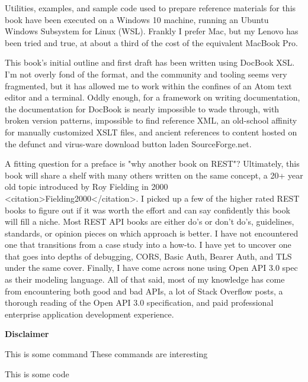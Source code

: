 Utilities, examples, and sample code used to prepare reference materials for this book have been executed on a Windows 10 machine, running an Ubuntu Windows Subsystem for Linux (WSL).  Frankly I prefer Mac, but my Lenovo has been tried and true, at about a third of the cost of the equivalent MacBook Pro.

This book's initial outline and first draft has been written using DocBook XSL.  I'm not overly fond of the format, and the community and tooling seems very fragmented, but it has allowed me to work within the confines of an Atom text editor and a terminal.  Oddly enough, for a framework on writing documentation, the documentation for DocBook is nearly impossible to wade through, with broken version patterns, impossible to find reference XML, an old-school affinity for manually customized XSLT files, and ancient references to content hosted on the defunct and virus-ware download button laden SourceForge.net.

A fitting question for a preface is "why another book on REST"?  Ultimately, this book will share a shelf with many others written on the same concept, a 20+ year old topic introduced by Roy Fielding in 2000 <citation>Fielding2000</citation>.  I picked up a few of the higher rated REST books to figure out if it was worth the effort and can say confidently this book will fill a niche. Most REST API books are either do's or don't do's, guidelines, standards, or opinion pieces on which approach is better.  I have not encountered one that transitions from a case study into a how-to.  I have yet to uncover one that goes into depths of debugging, CORS, Basic Auth, Bearer Auth, and TLS under the same cover.  Finally, I have come across none using Open API 3.0 spec as their modeling language.  All of that said, most of my knowledge has come from encountering both good and bad APIs, a lot of Stack Overflow posts, a thorough reading of the Open API 3.0 specification, and paid professional enterprise application development experience.

\begin{sidebar}
\begin{center}
\textbf{Disclaimer}
\end{center}
This is some command
These commands are interesting
\end{sidebar}

\begin{code}
This is some code
\end{code}
